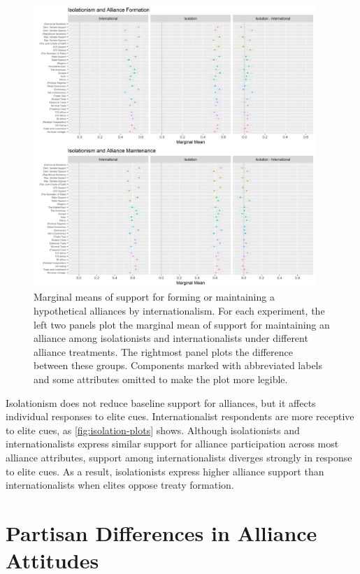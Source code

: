 \documentclass[12pt]{article}
\begin{document}
\begin{figure}
	\centering
		\includegraphics[width=0.95\textwidth]{isolation-plots.png}
	\caption{Marginal means of support for forming or maintaining a hypothetical alliances by internationalism. For each experiment, the left two panels plot the marginal mean of support for maintaining an alliance among isolationists and internationalists under different alliance treatments. The rightmost panel plots the difference between these groups. Components marked with abbreviated labels and some attributes omitted to make the plot more legible.}
	\label{fig:isolation-plots}
\end{figure}


Isolationism does not reduce baseline support for alliances, but it affects individual responses to elite cues. 
Internationalist respondents are more receptive to elite cues, as \autoref{fig:isolation-plots} shows. 
Although isolationists and internationalists express similar support for alliance participation across most alliance attributes, support among internationalists diverges strongly in response to elite cues. 
As a result, isolationists express higher alliance support than internationalists when elites oppose treaty formation. 




\newpage 



\section{Partisan Differences in Alliance Attitudes}
\end{document}

